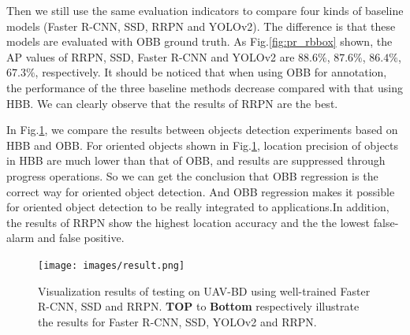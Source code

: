 Then we still use the same evaluation indicators to compare four kinds of baseline models (Faster R-CNN, SSD, RRPN and YOLOv2). The difference is that these models are evaluated with OBB ground truth. As Fig.\ref{fig:pr_rbbox} shown, the AP values of RRPN, SSD, Faster R-CNN and YOLOv2 are $ 88.6\% $, $ 87.6\% $, $ 86.4\% $, $ 67.3\% $, respectively. It should be noticed that when using OBB for annotation, the performance of the three baseline methods decrease compared with that using HBB. We can clearly observe that the results of RRPN are the best.

In Fig.\ref{fig:result}, we compare the results between objects detection experiments based on HBB and OBB. For oriented objects shown in Fig.\ref{fig:result}, location precision of objects in HBB are much lower than that of OBB, and results are suppressed through progress operations. So we can get the conclusion that OBB regression is the correct way for oriented object detection. And OBB regression makes it possible for oriented object detection to be really integrated to applications.In addition, the results of RRPN show the highest location accuracy and the the lowest false-alarm and false positive.


\begin{figure}
	\texttt{[image: images/result.png]}
	\caption{Visualization results of testing on UAV-BD using well-trained Faster R-CNN, SSD and RRPN. \textbf{TOP} to \textbf{Bottom} respectively illustrate the results for Faster R-CNN, SSD, YOLOv2 and RRPN.}
	\label{fig:result}
\end{figure}


















